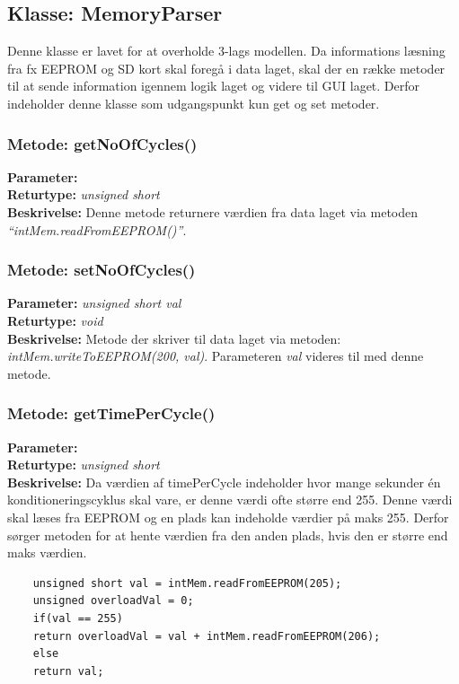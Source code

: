 \subsection{Klasse: MemoryParser}
Denne klasse er lavet for at overholde 3-lags modellen. Da informations læsning fra fx EEPROM og SD kort skal foregå i data laget, skal der en række metoder til at sende information igennem logik laget og videre til GUI laget. Derfor indeholder denne klasse som udgangspunkt kun get og set metoder. 

\subsubsection{Metode: getNoOfCycles()}
\textbf{Parameter: } 
\\ \textbf{Returtype: } \textit{unsigned short}
\\ \textbf{Beskrivelse: } Denne metode returnere værdien fra data laget via metoden \textit{“intMem.readFromEEPROM()”}.

\subsubsection{Metode: setNoOfCycles()}
\textbf{Parameter: } \textit{unsigned short val}
\\ \textbf{Returtype: } \textit{void}
\\ \textbf{Beskrivelse: } Metode der skriver til data laget via metoden: \textit{intMem.writeToEEPROM(200, val)}. Parameteren \textit{val} videres til med denne metode. 

\subsubsection{Metode: getTimePerCycle()}
\textbf{Parameter: } 
\\ \textbf{Returtype: } \textit{unsigned short}
\\ \textbf{Beskrivelse: } Da værdien af timePerCycle indeholder hvor mange sekunder én konditioneringscyklus skal vare, er denne værdi ofte større end 255. Denne værdi skal læses fra EEPROM og en plads kan indeholde værdier på maks 255. Derfor sørger metoden for at hente værdien fra den anden plads, hvis den er større end maks værdien. 
\begin{lstlisting}
	unsigned short val = intMem.readFromEEPROM(205);
	unsigned overloadVal = 0;
	if(val == 255)
	return overloadVal = val + intMem.readFromEEPROM(206);
	else
	return val;
\end{lstlisting}


